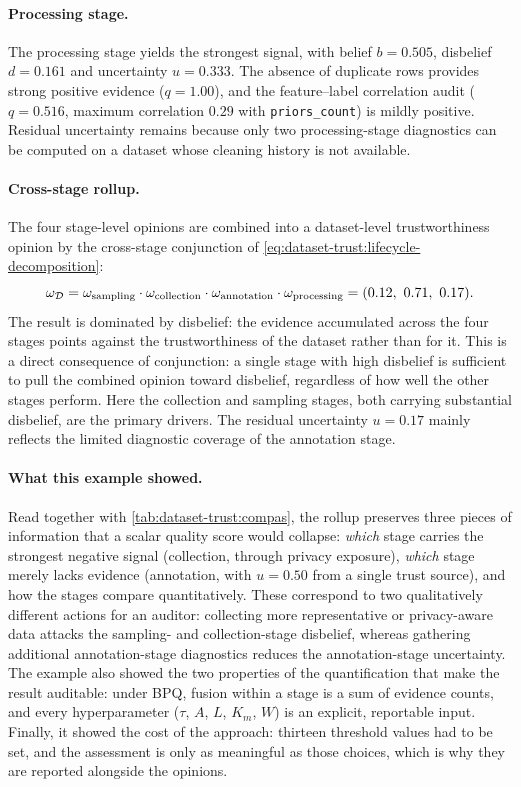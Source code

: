 \paragraph{Processing stage.}
The processing stage yields the strongest signal, with belief $b = 0.505$, disbelief $d = 0.161$ and uncertainty $u = 0.333$. The absence of duplicate rows provides strong positive evidence ($q = 1.00$), and the feature--label correlation audit ($q = 0.516$, maximum correlation $0.29$ with \texttt{priors\_count}) is mildly positive. Residual uncertainty remains because only two processing-stage diagnostics can be computed on a dataset whose cleaning history is not available.

\paragraph{Cross-stage rollup.}
The four stage-level opinions are combined into a dataset-level trustworthiness opinion by the cross-stage conjunction of \cref{eq:dataset-trust:lifecycle-decomposition}:
\[
\omega_{\mathcal{D}}
= \omega_{\text{sampling}} \cdot
  \omega_{\text{collection}} \cdot
  \omega_{\text{annotation}} \cdot
  \omega_{\text{processing}} = (0.12,\ 0.71,\ 0.17).
\]
The result is dominated by disbelief: the evidence accumulated across the four stages points against the trustworthiness of the dataset rather than for it. This is a direct consequence of conjunction: a single stage with high disbelief is sufficient to pull the combined opinion toward disbelief, regardless of how well the other stages perform. Here the collection and sampling stages, both carrying substantial disbelief, are the primary drivers. The residual uncertainty $u = 0.17$ mainly reflects the limited diagnostic coverage of the annotation stage.

\paragraph{What this example showed.}
Read together with \cref{tab:dataset-trust:compas}, the rollup preserves three pieces of information that a scalar quality score would collapse: \emph{which} stage carries the strongest negative signal (collection, through privacy exposure), \emph{which} stage merely lacks evidence (annotation, with $u = 0.50$ from a single trust source), and how the stages compare quantitatively. These correspond to two qualitatively different actions for an auditor: collecting more representative or privacy-aware data attacks the sampling- and collection-stage disbelief, whereas gathering additional annotation-stage diagnostics reduces the annotation-stage uncertainty. The example also showed the two properties of the quantification that make the result auditable: under \ac{BPQ}, fusion within a stage is a sum of evidence counts, and every hyperparameter ($\tau$, $A$, $L$, $K_m$, $W$) is an explicit, reportable input. Finally, it showed the cost of the approach: thirteen threshold values had to be set, and the assessment is only as meaningful as those choices, which is why they are reported alongside the opinions.

